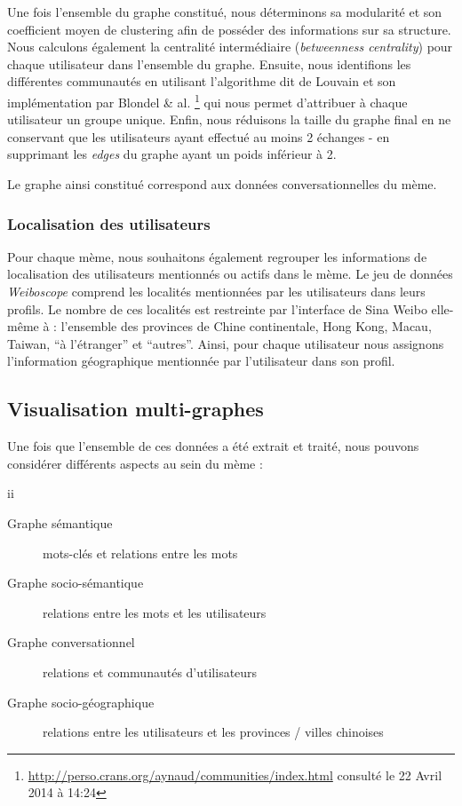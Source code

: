 Une fois l{\textquoteright}ensemble du graphe constitu\'e, nous
d\'eterminons sa modularit\'e et son coefficient moyen de clustering
afin de poss\'eder des informations sur sa structure. Nous calculons
\'egalement la centralit\'e interm\'ediaire (\textit{betweenness
centrality}) pour chaque utilisateur dans l{\textquoteright}ensemble du
graphe. Ensuite, nous identifions les diff\'erentes communaut\'es en
utilisant l{\textquoteright}algorithme dit de Louvain et son
impl\'ementation par Blondel \& al. \citep{Blondel2008}\footnote{
\url{http://perso.crans.org/aynaud/communities/index.html} consult\'e
le 22 Avril 2014 \`a 14:24} qui nous permet d{\textquoteright}attribuer
\`a chaque utilisateur un groupe unique. Enfin, nous r\'eduisons la
taille du graphe final en ne conservant que les utilisateurs ayant
effectu\'e au moins 2 \'echanges - en supprimant les \textit{edges} du
graphe ayant un poids inf\'erieur \`a 2.

Le graphe ainsi constitu\'e correspond aux donn\'ees conversationnelles
du m\`eme.

\subsubsection{Localisation des utilisateurs}

Pour chaque m\`eme, nous souhaitons \'egalement regrouper les
informations de localisation des utilisateurs mentionn\'es ou actifs
dans le m\`eme. Le jeu de donn\'ees \textit{Weiboscope }comprend les
localit\'es mentionn\'ees par les utilisateurs dans leurs profils. Le
nombre de ces localit\'es est restreinte par
l{\textquoteright}interface de Sina Weibo elle-m\^eme \`a :
l{\textquoteright}ensemble des provinces de Chine continentale, Hong
Kong, Macau, Taiwan, {\textquotedblleft}\`a
l{\textquoteright}\'etranger{\textquotedblright} et
{\textquotedblleft}autres{\textquotedblright}. Ainsi, pour chaque
utilisateur nous assignons l{\textquoteright}information g\'eographique
mentionn\'ee par l{\textquoteright}utilisateur dans son profil.

\subsection{Visualisation multi-graphes}
Une fois que l{\textquoteright}ensemble de ces donn\'ees a \'et\'e
extrait et trait\'e, nous pouvons consid\'erer diff\'erents aspects au
sein du m\`eme :

ii
\begin{description}
\item[Graphe s\'emantique] mots-cl\'es et relations entre les mots
\item[Graphe socio-s\'emantique] relations entre les mots et les
utilisateurs
\item[Graphe conversationnel] relations et communaut\'es
d{\textquoteright}utilisateurs 
\item[Graphe socio-g\'eographique] relations entre les utilisateurs et
les provinces / villes chinoises
\end{description}


